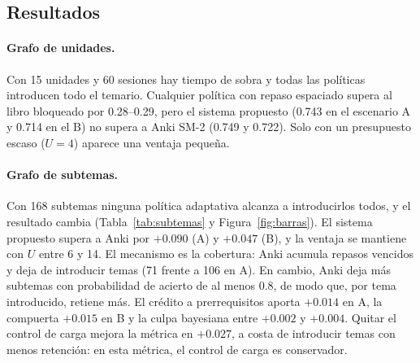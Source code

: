 \documentclass[12pt]{article}
\theoremstyle{definition}
\begin{document}
\subsection{Resultados}

\paragraph{Grafo de unidades.} Con 15 unidades y 60 sesiones hay tiempo de sobra y todas las políticas introducen todo el temario. Cualquier política con repaso espaciado supera al libro bloqueado por 0.28--0.29, pero el sistema propuesto (0.743 en el escenario A y 0.714 en el B) no supera a Anki SM-2 (0.749 y 0.722). Solo con un presupuesto escaso ($U=4$) aparece una ventaja pequeña.

\paragraph{Grafo de subtemas.} Con 168 subtemas ninguna política adaptativa alcanza a introducirlos todos, y el resultado cambia (Tabla~\ref{tab:subtemas} y Figura~\ref{fig:barras}). El sistema propuesto supera a Anki por $+0.090$ (A) y $+0.047$ (B), y la ventaja se mantiene con $U$ entre 6 y 14. El mecanismo es la cobertura: Anki acumula repasos vencidos y deja de introducir temas (71 frente a 106 en A). En cambio, Anki deja más subtemas con probabilidad de acierto de al menos 0.8, de modo que, por tema introducido, retiene más. El crédito a prerrequisitos aporta $+0.014$ en A, la compuerta $+0.015$ en B y la culpa bayesiana entre $+0.002$ y $+0.004$. Quitar el control de carga mejora la métrica en $+0.027$, a costa de introducir temas con menos retención: en esta métrica, el control de carga es conservador.
\end{document}
